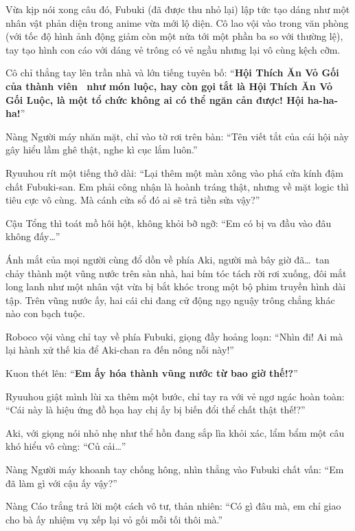 \documentclass[../main.tex]{subfiles}
\begin{document}
Vừa kịp nói xong câu đó, Fubuki (đã được thu nhỏ lại) lập tức tạo dáng như một nhân vật phản diện trong anime vừa mới lộ diện. Cô lao vội vào trong văn phòng (với tốc độ hình ảnh động giảm còn một nửa tới một phần ba so với thường lệ), tay tạo hình con cáo với dáng vẻ trông có vẻ ngầu nhưng lại vô cùng kệch cỡm.


Cô chỉ thẳng tay lên trần nhà và lớn tiếng tuyên bố: ``\textbf{Hội Thích Ăn Vỏ Gối của thành viên \hll\ như món luộc, hay còn gọi tắt là Hội Thích Ăn Vỏ Gối Luộc, là một tổ chức không ai có thể ngăn cản được! Hội ha-ha-ha!}''

Nàng Người máy nhăn mặt, chỉ vào tờ rơi trên bàn: ``Tên viết tắt của cái hội này gây hiểu lầm ghê thật, nghe kì cục lắm luôn.''

Ryuuhou rít một tiếng thở dài: ``Lại thêm một màn xông vào phá cửa kính đậm chất Fubuki-san. Em phải công nhận là hoành tráng thật, nhưng về mặt logic thì tiêu cực vô cùng. Mà cánh cửa sổ đó ai sẽ trả tiền sửa vậy?''

Cậu Tổng thì toát mồ hôi hột, không khỏi bỡ ngỡ: ``Em có bị va đầu vào đâu không đấy\dots''

Ánh mắt của mọi người cùng đổ dồn về phía Aki, người mà bây giờ đã\dots\ tan chảy thành một vũng nước trên sàn nhà, hai bím tóc tách rời rơi xuống, đôi mắt long lanh như một nhân vật vừa bị bắt khóc trong một bộ phim truyền hình dài tập. Trên vũng nước ấy, hai cái chi đang cử động ngọ nguậy trông chẳng khác nào con bạch tuộc.


Roboco vội vàng chỉ tay về phía Fubuki, giọng đầy hoảng loạn: ``Nhìn đi! Ai mà lại hành xử thế kia để Aki-chan ra đến nông nỗi này!''

Kuon thét lên: ``\textbf{Em ấy hóa thành vũng nước từ bao giờ thế!?}''

Ryuuhou giật mình lùi xa thêm một bước, chỉ tay ra với vẻ ngơ ngác hoàn toàn: ``Cái này là hiệu ứng đồ họa hay chị ấy bị biến đổi thể chất thật thế!?''

Aki, với giọng nói nhỏ nhẹ như thể hồn đang sắp lìa khỏi xác, lẩm bẩm một câu khó hiểu vô cùng: ``Củ cải\dots''

Nàng Người máy khoanh tay chống hông, nhìn thẳng vào Fubuki chất vấn: ``Em đã làm gì với cậu ấy vậy?''

Nàng Cáo trắng trả lời một cách vô tư, thản nhiên: ``Có gì đâu mà, em chỉ giao cho bà ấy nhiệm vụ xếp lại vỏ gối mỗi tối thôi mà.''
\end{document}
